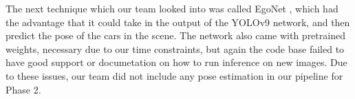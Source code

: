 The next technique which our team looked into was called EgoNet \cite{EgoNet}, which had the advantage that it could take in the output of the YOLOv9 network, and then predict the pose of the cars in the scene. The network also came with pretrained weights, necessary due to our time constraints, but again the code base failed to have good support or documetation on how to run inference on new images. Due to these issues, our team did not include any pose estimation in our pipeline for Phase 2.
